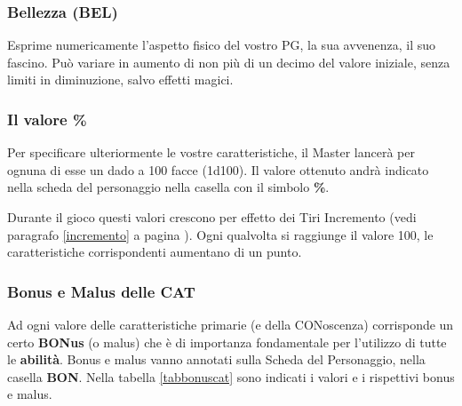 \subsubsection{Bellezza (BEL)}

Esprime numericamente l'aspetto fisico del vostro PG, la sua
avvenenza, il suo fascino. Pu\`o variare in aumento di non pi\`u
di un decimo del valore iniziale, senza limiti in diminuzione, salvo
effetti magici.



\subsubsection {Il valore \%}

Per specificare ulteriormente le vostre caratteristiche, il Master
lancer\`a per ognuna di esse un dado a 100 facce (1d100). Il valore
ottenuto andr\`a indicato nella scheda del personaggio nella casella
con il simbolo \textbf{\%}. 

Durante il gioco questi valori crescono per effetto dei Tiri
Incremento (vedi paragrafo \ref{incremento} a pagina
\pageref{incremento}). Ogni qualvolta si raggiunge il valore 100, le
caratteristiche corrispondenti aumentano di un punto.




{\raggedright \subsubsection{Bonus e Malus delle CAT}}

Ad ogni valore delle caratteristiche primarie (e della CONoscenza)
corrisponde un certo \textbf{BONus} (o malus) che \`e di importanza
fondamentale per l'utilizzo di tutte le \textbf{abilit\`a}.  Bonus e
malus vanno annotati sulla Scheda del Personaggio, nella casella
\textbf{BON}. Nella tabella \ref{tabbonuscat} sono indicati i valori e
i rispettivi bonus e malus.

